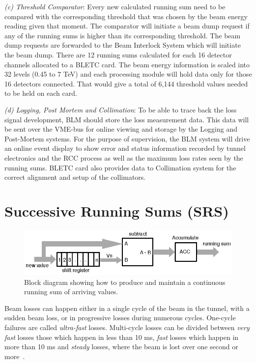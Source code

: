 \documentclass{llncs}
\begin{document}
\emph{(c) Threshold Comparator}: Every new calculated running sum need to be compared with the corresponding threshold that was chosen by the beam energy reading given that moment.
The comparator will initiate a beam dump request if any of the running sums is higher than its corresponding threshold.
The beam dump requests are forwarded to the Beam Interlock System which will initiate the beam dump.
There are 12 running sums calculated for each 16 detector channels allocated to a BLETC card.
The beam energy information is scaled into 32 levels (0.45 to 7 TeV) and each processing module will hold data only for those 16 detectors connected.
That would give a total of 6,144 threshold values needed to be held on each card.

\emph{(d) Logging, Post Mortem and Collimation}:  To be able to trace back the loss signal development, BLM should store the loss measurement data.
This data will be sent over the VME-bus for online viewing and storage by the Logging and Post-Mortem systems.
For the purpose of supervision, the BLM system will drive an online event display to show error and status information recorded by tunnel electronics and the RCC process as well as the maximum loss rates seen by the running sums.
BLETC card also provides data to Collimation system for the correct alignment and setup of the collimators.


\section{Successive Running Sums (SRS)}
\label{sec-SRS}

\begin{figure}[t]
  \centering \includegraphics{rs.eps}
   \caption{Block diagram showing how to produce and maintain a continuous running sum of arriving values.}
  \label{fig:RS-basic}
\end{figure}

Beam losses can happen either in a single cycle of the beam in the tunnel, with a sudden beam loss, or in progressive losses during numerous cycles.
One-cycle failures are called \emph{ultra-fast} losses.
Multi-cycle losses can be divided between \emph{very fast} losses those which happen in less than 10 ms, \emph{fast} losses which happen in more than 10 ms and \emph{steady} losses, where the beam is lost over one second or more~\cite{Schmidt-ICFA}.
\end{document}

